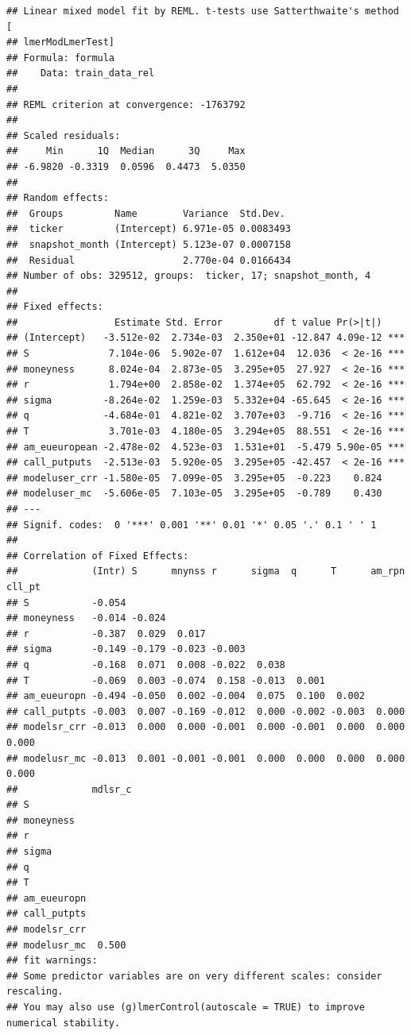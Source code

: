 \documentclass[
]{article}
\begin{document}
\begin{verbatim}
## Linear mixed model fit by REML. t-tests use Satterthwaite's method [
## lmerModLmerTest]
## Formula: formula
##    Data: train_data_rel
## 
## REML criterion at convergence: -1763792
## 
## Scaled residuals: 
##     Min      1Q  Median      3Q     Max 
## -6.9820 -0.3319  0.0596  0.4473  5.0350 
## 
## Random effects:
##  Groups         Name        Variance  Std.Dev. 
##  ticker         (Intercept) 6.971e-05 0.0083493
##  snapshot_month (Intercept) 5.123e-07 0.0007158
##  Residual                   2.770e-04 0.0166434
## Number of obs: 329512, groups:  ticker, 17; snapshot_month, 4
## 
## Fixed effects:
##                 Estimate Std. Error         df t value Pr(>|t|)    
## (Intercept)   -3.512e-02  2.734e-03  2.350e+01 -12.847 4.09e-12 ***
## S              7.104e-06  5.902e-07  1.612e+04  12.036  < 2e-16 ***
## moneyness      8.024e-04  2.873e-05  3.295e+05  27.927  < 2e-16 ***
## r              1.794e+00  2.858e-02  1.374e+05  62.792  < 2e-16 ***
## sigma         -8.264e-02  1.259e-03  5.332e+04 -65.645  < 2e-16 ***
## q             -4.684e-01  4.821e-02  3.707e+03  -9.716  < 2e-16 ***
## T              3.701e-03  4.180e-05  3.294e+05  88.551  < 2e-16 ***
## am_eueuropean -2.478e-02  4.523e-03  1.531e+01  -5.479 5.90e-05 ***
## call_putputs  -2.513e-03  5.920e-05  3.295e+05 -42.457  < 2e-16 ***
## modeluser_crr -1.580e-05  7.099e-05  3.295e+05  -0.223    0.824    
## modeluser_mc  -5.606e-05  7.103e-05  3.295e+05  -0.789    0.430    
## ---
## Signif. codes:  0 '***' 0.001 '**' 0.01 '*' 0.05 '.' 0.1 ' ' 1
## 
## Correlation of Fixed Effects:
##             (Intr) S      mnynss r      sigma  q      T      am_rpn cll_pt
## S           -0.054                                                        
## moneyness   -0.014 -0.024                                                 
## r           -0.387  0.029  0.017                                          
## sigma       -0.149 -0.179 -0.023 -0.003                                   
## q           -0.168  0.071  0.008 -0.022  0.038                            
## T           -0.069  0.003 -0.074  0.158 -0.013  0.001                     
## am_eueuropn -0.494 -0.050  0.002 -0.004  0.075  0.100  0.002              
## call_putpts -0.003  0.007 -0.169 -0.012  0.000 -0.002 -0.003  0.000       
## modelsr_crr -0.013  0.000  0.000 -0.001  0.000 -0.001  0.000  0.000  0.000
## modelusr_mc -0.013  0.001 -0.001 -0.001  0.000  0.000  0.000  0.000  0.000
##             mdlsr_c
## S                  
## moneyness          
## r                  
## sigma              
## q                  
## T                  
## am_eueuropn        
## call_putpts        
## modelsr_crr        
## modelusr_mc  0.500 
## fit warnings:
## Some predictor variables are on very different scales: consider rescaling. 
## You may also use (g)lmerControl(autoscale = TRUE) to improve numerical stability.
\end{verbatim}
\end{document}
